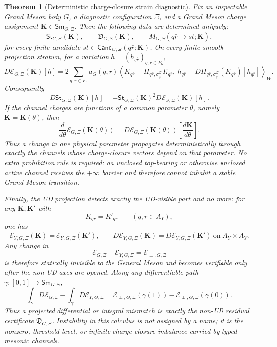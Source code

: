\documentclass[11pt]{article}
\theoremstyle{definition}
\theoremstyle{plain}
\newtheorem{theorem}[definition]{Theorem}
\begin{document}
\begin{theorem}[Deterministic charge-closure strain diagnostic]
Fix an inspectable Grand Meson body \(G\), a diagnostic configuration
\(\Xi\), and a Grand Meson charge
assignment \(\mathbf K\in\mathsf{Sm}_{G,\Xi}\).  Then the following data
are determined uniquely:
\[
  \mathsf{St}_{G,\Xi}(\mathbf K),\qquad
  \mathfrak D_{G,\Xi}(\mathbf K),\qquad
  M_{G,\Xi}(q\bar r\to s\bar t;\mathbf K),
\]
for every finite candidate \(s\bar t\in
\mathsf{Cand}_{G,\Xi}(q\bar r;\mathbf K)\).  On every finite smooth projection
stratum, for a variation
\(h=(h_{q\bar r})_{q,r\in F_6}\),
\[
  D\mathcal E_{G,\Xi}(\mathbf K)[h]
  =
  2\sum_{q,r\in F_6}
  a_G(q,\bar r)
  \left\langle
    K_{q\bar r}-\Pi_{q\bar r,\sigma^\Xi_{q\bar r}}K_{q\bar r},\
    h_{q\bar r}
    -D\Pi_{q\bar r,\sigma^\Xi_{q\bar r}}(K_{q\bar r})[h_{q\bar r}]
  \right\rangle_W .
\]
Consequently
\[
  D\mathsf{St}_{G,\Xi}(\mathbf K)[h]
  =
  -\mathsf{St}_{G,\Xi}(\mathbf K)^2
  D\mathcal E_{G,\Xi}(\mathbf K)[h].
\]
If the channel charges are functions of a common parameter
\(\theta\), namely \(\mathbf K=\mathbf K(\theta)\), then
\[
  \frac{d}{d\theta}\mathcal E_{G,\Xi}(\mathbf K(\theta))
  =
  D\mathcal E_{G,\Xi}(\mathbf K(\theta))
  \left[\frac{d\mathbf K}{d\theta}\right].
\]
Thus a change in one physical parameter propagates deterministically
through exactly the channels whose charge-closure vectors depend on that
parameter.  No extra prohibition rule is required: an unclosed top-bearing
or otherwise unclosed active channel receives the \(+\infty\) barrier and
therefore cannot inhabit a stable Grand Meson transition.

Finally, the UD projection detects exactly the UD-visible part and no more:
for any \(\mathbf K,\mathbf K'\) with
\[
  K_{q\bar r}=K'_{q\bar r}
  \qquad(q,r\in A_Y),
\]
one has
\[
  \mathcal E_{Y,G,\Xi}(\mathbf K)=\mathcal E_{Y,G,\Xi}(\mathbf K'),
  \qquad
  D\mathcal E_{Y,G,\Xi}(\mathbf K)=D\mathcal E_{Y,G,\Xi}(\mathbf K')
  \ \text{on }A_Y\times\overline{A_Y}.
\]
Any change in
\[
  \mathcal E_{G,\Xi}-\mathcal E_{Y,G,\Xi}
  =
  \mathcal E_{\perp,G,\Xi}
\]
is therefore statically invisible to the General Meson and becomes
verifiable only after the non-UD axes are opened.  Along any differentiable
path \(\gamma:[0,1]\to\mathsf{Sm}_{G,\Xi}\),
\[
  \int_{\gamma}D\mathcal E_{G,\Xi}
  -
  \int_{\gamma}D\mathcal E_{Y,G,\Xi}
  =
  \mathcal E_{\perp,G,\Xi}(\gamma(1))
  -
  \mathcal E_{\perp,G,\Xi}(\gamma(0)).
\]
Thus a projected differential or integral mismatch is exactly the non-UD
residual certificate \(\mathfrak D_{G,\Xi}\).  Instability in this calculus is
not assigned by a name; it is the nonzero, threshold-level, or infinite
charge-closure imbalance carried by typed mesonic channels.
\end{theorem}
\end{document}
